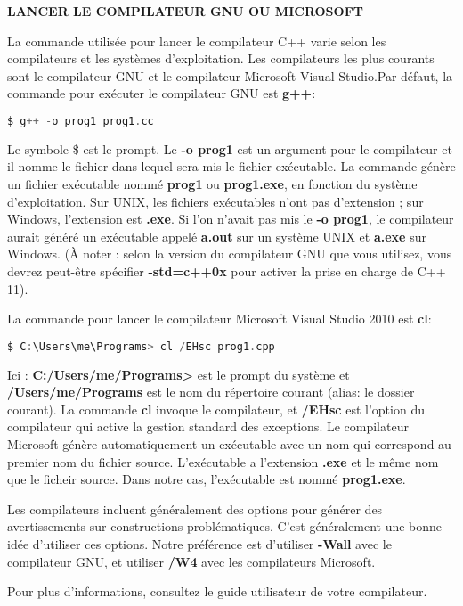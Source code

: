 \begin{shadebox}
	\textbf{LANCER LE COMPILATEUR GNU OU MICROSOFT}
	
	La commande utilisée pour lancer le compilateur C++ varie selon les compilateurs et les systèmes d'exploitation. Les compilateurs les plus courants sont le compilateur GNU et le compilateur Microsoft Visual Studio.Par défaut, la commande pour exécuter le compilateur GNU est \textbf{g++}:
	
	\medbreak
	\begin{lstlisting}[language=C]
		$ g++ -o prog1 prog1.cc
	\end{lstlisting}
	\medbreak
	
	Le symbole \$ est le prompt. Le \textbf{-o prog1} est un argument pour le compilateur et il nomme le fichier dans lequel sera mis le fichier exécutable. La commande génère un fichier exécutable nommé \textbf{prog1} ou \textbf{prog1.exe}, en fonction du système d'exploitation. Sur UNIX, les fichiers exécutables n'ont pas d'extension ; sur Windows, l'extension est \textbf{.exe}. Si l'on n'avait pas mis le \textbf{-o prog1}, le compilateur aurait généré un exécutable appelé \textbf{a.out} sur un système UNIX et \textbf{a.exe} sur Windows. (À noter : selon la version du compilateur GNU que vous utilisez, vous devrez peut-être spécifier \textbf{-std=c++0x} pour activer la prise en charge de C++ 11).   
	
	La commande pour lancer le compilateur Microsoft Visual Studio 2010 est \textbf{cl}:
	
	\medbreak
	\begin{lstlisting}[language=C]
		$ C:\Users\me\Programs> cl /EHsc prog1.cpp
	\end{lstlisting}
	\medbreak
	
	Ici : \textbf{C:/Users/me/Programs>} est le prompt du système et \textbf{/Users/me/Programs} est le nom du répertoire courant (alias: le dossier courant). La commande \textbf{cl} invoque le compilateur, et \textbf{/EHsc} est l'option du compilateur qui active la gestion standard des exceptions. Le compilateur Microsoft génère automatiquement un exécutable avec un nom qui correspond au premier nom du fichier source. L'exécutable a l'extension \textbf{.exe} et le même nom que le ficheir source. Dans notre cas, l'exécutable est nommé \textbf{prog1.exe}.
	
	Les compilateurs incluent généralement des options pour générer des avertissements sur constructions problématiques. C'est généralement une bonne idée d'utiliser ces options. Notre préférence est d'utiliser \textbf{-Wall} avec le compilateur GNU, et utiliser \textbf{/W4} avec les compilateurs Microsoft.
	
	Pour plus d'informations, consultez le guide utilisateur de votre compilateur.
	
\end{shadebox} 

